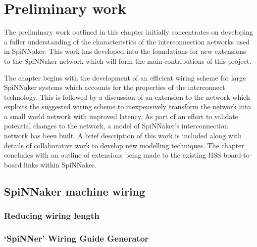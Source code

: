 \chapter{Preliminary work}
	\label{sec:preliminary-work}
	
	
	The preliminary work outlined in this chapter initially concentrates on
	developing a fuller understanding of the characteristics of the
	interconnection networks used in SpiNNaker. This work has developed into the
	foundations for new extensions to the SpiNNaker network which will form the
	main contributions of this project.
	
	The chapter begins with the development of an efficient wiring scheme for
	large SpiNNaker systems which accounts for the properties of the interconnect
	technology. This is followed by a discussion of an extension to the network
	which exploits the suggested wiring scheme to inexpensively transform the
	network into a small world network with improved latency.  As part of an
	effort to validate potential changes to the network, a model of SpiNNaker's
	interconnection network has been built. A brief description of this work is
	included along with details of collaborative work to develop new modelling
	techniques.  The chapter concludes with an outline of extensions being made to
	the existing HSS board-to-board links within SpiNNaker.
	
	\section{SpiNNaker machine wiring}
		
		
		\subsection{Reducing wiring length}
			
		
		\subsection{`SpiNNer' Wiring Guide Generator}
			
	
